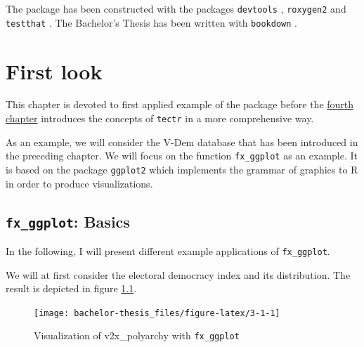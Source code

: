 \documentclass[]{report}
\newenvironment{Shaded}{\begin{snugshade}}{\end{snugshade}}
\newcommand{\KeywordTok}[1]{\textcolor[rgb]{0.13,0.29,0.53}{\textbf{#1}}}
\newcommand{\DataTypeTok}[1]{\textcolor[rgb]{0.13,0.29,0.53}{#1}}
\newcommand{\StringTok}[1]{\textcolor[rgb]{0.31,0.60,0.02}{#1}}
\newcommand{\CommentTok}[1]{\textcolor[rgb]{0.56,0.35,0.01}{\textit{#1}}}
\newcommand{\OperatorTok}[1]{\textcolor[rgb]{0.81,0.36,0.00}{\textbf{#1}}}
\newcommand{\NormalTok}[1]{#1}
\theoremstyle{definition}
\theoremstyle{definition}
\theoremstyle{definition}
\theoremstyle{remark}
\begin{document}
The package has been constructed with the packages \texttt{devtools}
\citep{devtools}, \texttt{roxygen2} \citep{roxygen2} and
\texttt{testthat} \citep{testthat}. The Bachelor's Thesis has been
written with \texttt{bookdown} \citep[\citet{bookdown-2}]{bookdown-1}.

\chapter{First look}\label{first-look}

This chapter is devoted to first applied example of the package before
the \protect\hyperlink{concept}{fourth chapter} introduces the concepts
of \texttt{tectr} in a more comprehensive way.

As an example, we will consider the V-Dem database that has been
introduced in the preceding chapter. We will focus on the function
\texttt{fx\_ggplot} as an example. It is based on the package
\texttt{ggplot2} which implements the grammar of graphics to R in order
to produce visualizations. \citep{ggplot}

\section{\texorpdfstring{\texttt{fx\_ggplot}:
Basics}{fx\_ggplot: Basics}}\label{fx_ggplot-basics}

In the following, I will present different example applications of
\texttt{fx\_ggplot}.

We will at first consider the electoral democracy index and its
distribution. The result is depicted in figure \ref{fig:3-1}.

\begin{Shaded}
\end{Shaded}

\begin{figure}

{\centering \texttt{[image: bachelor-thesis\_files/figure-latex/3-1-1]} 

}

\caption{Visualization of v2x\_polyarchy with \texttt{fx\_ggplot}}\label{fig:3-1}
\end{figure}
\end{document}
